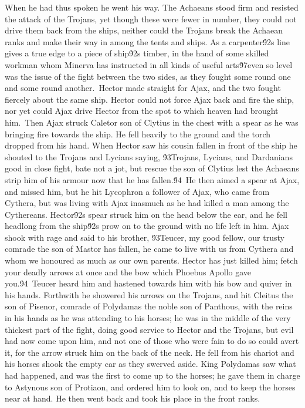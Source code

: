 {When he had thus spoken he went his way. The Achaeans stood firm and resisted the attack of the Trojans, yet though these were fewer in number, they could not drive them back from the ships, neither could the Trojans break the Achaean ranks and make their way in among the tents and ships. As a carpenter\'92s line gives a true edge to a piece of ship\'92s timber, in the hand of some skilled workman whom Minerva has instructed in all kinds of useful arts\'97even so level was the issue of the fight between the two sides, as they fought some round one and some round another.\
Hector made straight for Ajax, and the two fought fiercely about the same ship. Hector could not force Ajax back and fire the ship, nor yet could Ajax drive Hector from the spot to which heaven had brought him.\
Then Ajax struck Caletor son of Clytius in the chest with a spear as he was bringing fire towards the ship. He fell heavily to the ground and the torch dropped from his hand. When Hector saw his cousin fallen in front of the ship he shouted to the Trojans and Lycians saying, \'93Trojans, Lycians, and Dardanians good in close fight, bate not a jot, but rescue the son of Clytius lest the Achaeans strip him of his armour now that he has fallen.\'94\
He then aimed a spear at Ajax, and missed him, but he hit Lycophron a follower of Ajax, who came from Cythera, but was living with Ajax inasmuch as he had killed a man among the Cythereans. Hector\'92s spear struck him on the head below the ear, and he fell headlong from the ship\'92s prow on to the ground with no life left in him. Ajax shook with rage and said to his brother, \'93Teucer, my good fellow, our trusty comrade the son of Mastor has fallen, he came to live with us from Cythera and whom we honoured as much as our own parents. Hector has just killed him; fetch your deadly arrows at once and the bow which Phoebus Apollo gave you.\'94\
Teucer heard him and hastened towards him with his bow and quiver in his hands. Forthwith he showered his arrows on the Trojans, and hit Cleitus the son of Pisenor, comrade of Polydamas the noble son of Panthous, with the reins in his hands as he was attending to his horses; he was in the middle of the very thickest part of the fight, doing good service to Hector and the Trojans, but evil had now come upon him, and not one of those who were fain to do so could avert it, for the arrow struck him on the back of the neck. He fell from his chariot and his horses shook the empty car as they swerved aside. King Polydamas saw what had happened, and was the first to come up to the horses; he gave them in charge to Astynous son of Protiaon, and ordered him to look on, and to keep the horses near at hand. He then went back and took his place in the front ranks.\
}
